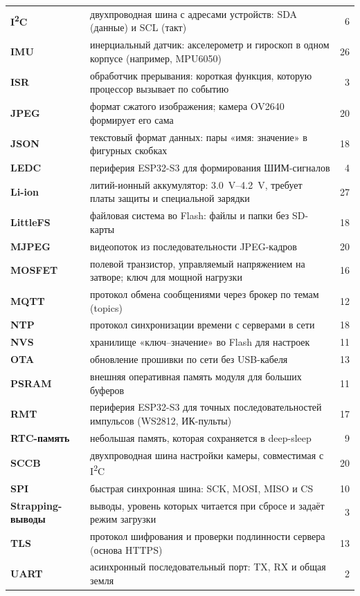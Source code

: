{\begin{xltabular}{\textwidth}{@{}>{\bfseries}p{40mm} X r@{}}
I\textsuperscript{2}C & двухпроводная шина с адресами устройств: SDA (данные) и SCL (такт) & 6 \\
IMU & инерциальный датчик: акселерометр и гироскоп в одном корпусе (например, MPU6050) & 26 \\
ISR & обработчик прерывания: короткая функция, которую процессор вызывает по событию & 3 \\
JPEG & формат сжатого изображения; камера OV2640 формирует его сама & 20 \\
JSON & текстовый формат данных: пары «имя: значение» в фигурных скобках & 18 \\
LEDC & периферия ESP32-S3 для формирования ШИМ-сигналов & 4 \\
Li-ion & литий-ионный аккумулятор: \SIrange{3.0}{4.2}{V}, требует платы защиты и специальной зарядки & 27 \\
LittleFS & файловая система во Flash: файлы и папки без SD-карты & 18 \\
MJPEG & видеопоток из последовательности JPEG-кадров & 20 \\
MOSFET & полевой транзистор, управляемый напряжением на затворе; ключ для мощной нагрузки & 16 \\
MQTT & протокол обмена сообщениями через брокер по темам (topics) & 12 \\
NTP & протокол синхронизации времени с серверами в сети & 18 \\
NVS & хранилище «ключ--значение» во Flash для настроек & 11 \\
OTA & обновление прошивки по сети без USB-кабеля & 13 \\
PSRAM & внешняя оперативная память модуля для больших буферов & 11 \\
RMT & периферия ESP32-S3 для точных последовательностей импульсов (WS2812, ИК-пульты) & 17 \\
RTC-память & небольшая память, которая сохраняется в deep-sleep & 9 \\
SCCB & двухпроводная шина настройки камеры, совместимая с I\textsuperscript{2}C & 20 \\
SPI & быстрая синхронная шина: SCK, MOSI, MISO и CS & 10 \\
Strapping-выводы & выводы, уровень которых читается при сбросе и задаёт режим загрузки & 3 \\
TLS & протокол шифрования и проверки подлинности сервера (основа HTTPS) & 13 \\
UART & асинхронный последовательный порт: TX, RX и общая земля & 2 \\

\end{xltabular}}
